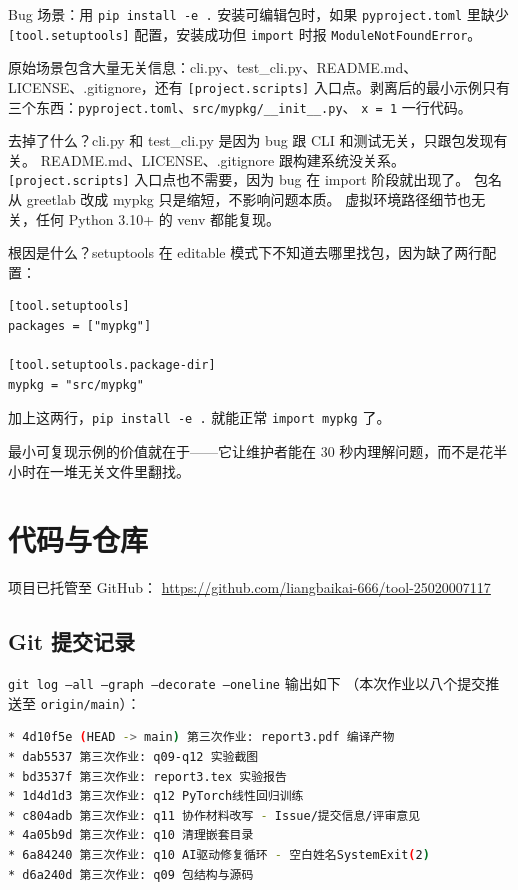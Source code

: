 \documentclass[a4paper,11pt]{ctexart}
\begin{document}
Bug 场景：用 \texttt{pip install -e .} 安装可编辑包时，如果 \texttt{pyproject.toml} 里缺少
\texttt{[tool.setuptools]} 配置，安装成功但 \texttt{import} 时报 \texttt{ModuleNotFoundError}。

原始场景包含大量无关信息：cli.py、test\_cli.py、README.md、LICENSE、.gitignore，还有 \texttt{[project.scripts]}
入口点。剥离后的最小示例只有三个东西：\texttt{pyproject.toml}、\texttt{src/mypkg/\_\_init\_\_.py}、
\texttt{x = 1} 一行代码。

去掉了什么？cli.py 和 test\_cli.py 是因为 bug 跟 CLI 和测试无关，只跟包发现有关。
README.md、LICENSE、.gitignore 跟构建系统没关系。
\texttt{[project.scripts]} 入口点也不需要，因为 bug 在 import 阶段就出现了。
包名从 greetlab 改成 mypkg 只是缩短，不影响问题本质。
虚拟环境路径细节也无关，任何 Python 3.10+ 的 venv 都能复现。

根因是什么？setuptools 在 editable 模式下不知道去哪里找包，因为缺了两行配置：

\begin{lstlisting}
[tool.setuptools]
packages = ["mypkg"]

[tool.setuptools.package-dir]
mypkg = "src/mypkg"
\end{lstlisting}

加上这两行，\texttt{pip install -e .} 就能正常 \texttt{import mypkg} 了。

最小可复现示例的价值就在于——它让维护者能在 30 秒内理解问题，而不是花半小时在一堆无关文件里翻找。

\section{代码与仓库}

项目已托管至 GitHub：
\url{https://github.com/liangbaikai-666/tool-25020007117}

\subsection{Git 提交记录}

\texttt{git log --all --graph --decorate --oneline} 输出如下
（本次作业以八个提交推送至 \texttt{origin/main}）：

\begin{lstlisting}[language=bash, numbers=none]
* 4d10f5e (HEAD -> main) 第三次作业: report3.pdf 编译产物
* dab5537 第三次作业: q09-q12 实验截图
* bd3537f 第三次作业: report3.tex 实验报告
* 1d4d1d3 第三次作业: q12 PyTorch线性回归训练
* c804adb 第三次作业: q11 协作材料改写 - Issue/提交信息/评审意见
* 4a05b9d 第三次作业: q10 清理嵌套目录
* 6a84240 第三次作业: q10 AI驱动修复循环 - 空白姓名SystemExit(2)
* d6a240d 第三次作业: q09 包结构与源码
\end{lstlisting}
\end{document}
